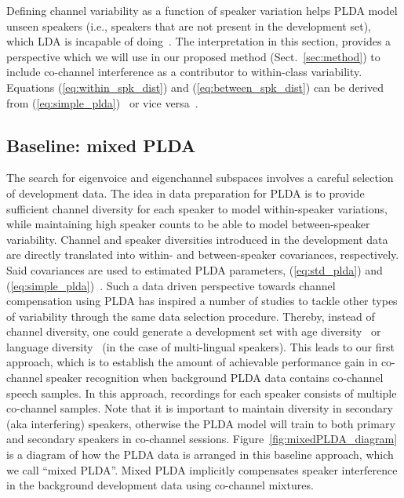 \documentclass[journal]{IEEEtran}
\begin{document}
Defining channel variability as a function of speaker variation helps PLDA model unseen speakers (i.e., speakers that are not present in the development set), which LDA is incapable of doing~\cite{ioffePLDA2006}. 
The interpretation in this section, provides a perspective which we will use in our proposed method (Sect.~\ref{sec:method}) to include co-channel interference as a contributor to within-class variability. 
Equations (\ref{eq:within_spk_dist}) and (\ref{eq:between_spk_dist}) can be derived from (\ref{eq:simple_plda})~\cite{sizov2014unifying} or vice versa~\cite{ioffePLDA2006}. 
 

\subsection{Baseline: mixed PLDA}
\label{ssec:plda_data_prep}
The search for eigenvoice and eigenchannel subspaces involves a careful selection of development data. 
The idea in data preparation for PLDA is to provide sufficient channel diversity for each speaker to model within-speaker variations, while maintaining high speaker counts to be able to model between-speaker variability. 
Channel and speaker diversities introduced in the development data are directly translated into within- and between-speaker covariances, respectively. Said covariances are used to estimated PLDA parameters, (\ref{eq:std_plda}) and (\ref{eq:simple_plda})~\cite{sizov2014unifying}. 
Such a data driven perspective towards channel compensation using PLDA has inspired a number of studies to tackle other types of variability through the same data selection procedure. 
Thereby, instead of channel diversity, one could generate a development set with age diversity~\cite{kelly2014thesis} or language diversity~\cite{misra2014languagemismatch} (in the case of multi-lingual speakers). 
This leads to our first approach, which is to establish the amount of achievable performance gain in co-channel speaker recognition when background PLDA data contains co-channel speech samples. 
In this approach, recordings for each speaker consists of multiple co-channel samples. 
Note that it is important to maintain diversity in secondary (aka interfering) speakers, otherwise the PLDA model will train to both primary and secondary speakers in co-channel sessions. 
Figure~\ref{fig:mixedPLDA_diagram} is a diagram of how the PLDA data is arranged in this baseline approach, which we call ``mixed PLDA''. 
Mixed PLDA implicitly compensates speaker interference in the background development data using co-channel mixtures. 
\end{document}
